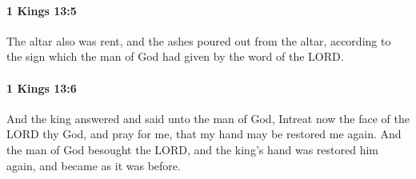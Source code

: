 		\paragraph{1 Kings 13:5} %
			\label{1KINGS-13-5}

			The altar also was rent, and the ashes poured out from the altar, according to the sign which the man of God had given by the word of the LORD.


		\paragraph{1 Kings 13:6} %
			\label{1KINGS-13-6}

			And the king answered and said unto the man of God, Intreat now the face of the LORD thy God, and pray for me, that my hand may be restored me again. And the man of God besought the LORD, and the king’s hand was restored him again, and became as it was before.

